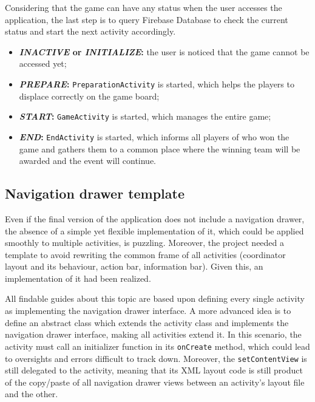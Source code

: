 			Considering that the game can have any status when the user accesses the application, the last step is to query Firebase Database to check the current status and start the next activity accordingly.
			\begin{itemize}
				\item \textbf{\emph{INACTIVE} or \emph{INITIALIZE}:} the user is noticed that the game cannot be accessed yet;
				\item \textbf{\emph{PREPARE}:} \lstinline|PreparationActivity| is started, which helps the players to displace correctly on the game board;
				\item \textbf{\emph{START}:} \lstinline|GameActivity| is started, which manages the entire game;
				\item \textbf{\emph{END}:} \lstinline|EndActivity| is started, which informs all players of who won the game and gathers them to a common place where the winning team will be awarded and the event will continue.
			\end{itemize}
		
		\subsection{Navigation drawer template}\label{focus:drawer}
		
			Even if the final version of the application does not include a navigation drawer, the absence of a simple yet flexible implementation of it, which could be applied smoothly to multiple activities, is puzzling.
			Moreover, the project needed a template to avoid rewriting the common frame of all activities (coordinator layout and its behaviour, action bar, information bar).
			Given this, an implementation of it had been realized.
			
			All findable guides about this topic are based upon defining every single activity as implementing the navigation drawer interface.
			A more advanced idea is to define an abstract class which extends the activity class and implements the navigation drawer interface, making all activities extend it.
			In this scenario, the activity must call an initializer function in its \lstinline|onCreate| method, which could lead to oversights and errors difficult to track down. Moreover, the \lstinline|setContentView| is still delegated to the activity, meaning that its XML layout code is still product of the copy/paste of all navigation drawer views between an activity's layout file and the other.
			
